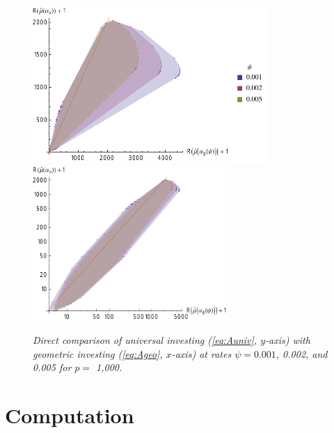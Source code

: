 \documentclass[12pt]{article}
\begin{document}
 \begin{figure}
 \caption{ \label{fig:univGeo} {\sl Direct comparison of universal investing
 (\ref{eq:Auniv}, $y$-axis) with geometric investing (\ref{eq:Ageo}, $x$-axis) at
 rates $\psi = 0.001$, 0.002, and 0.005 for $p=$ 1,000.}  }

 \vspace{0.1in}
 \centerline{
     \includegraphics[width=3.5in]{figures/univGeo}
     \includegraphics[width=2.9in]{figures/univGeoLog} }
 \vspace{0.2in}
 \end{figure}

\section{ Computation }
\end{document}
